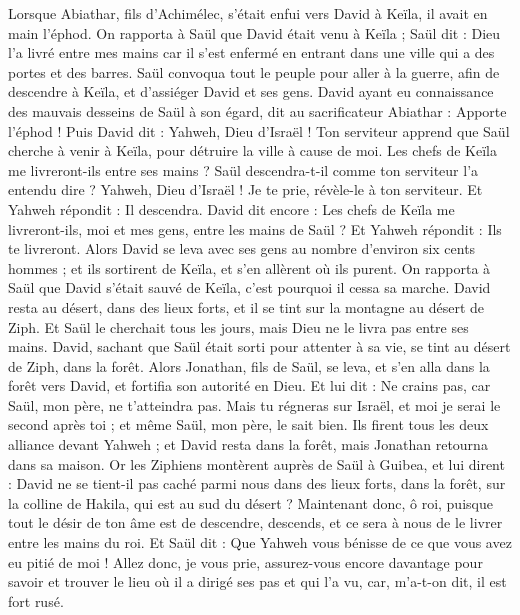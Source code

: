 \begin{multicols}{2}
Lorsque Abiathar, fils d'Achimélec, s'était enfui vers David à Keïla, il avait en main l'éphod.
On rapporta à Saül que David était venu à Keïla ; Saül dit : Dieu l'a livré entre mes mains car il s'est enfermé en entrant dans une ville qui a des portes et des barres.
Saül convoqua tout le peuple pour aller à la guerre, afin de descendre à Keïla, et d'assiéger David et ses gens.
David ayant eu connaissance des mauvais desseins de Saül à son égard, dit au sacrificateur Abiathar : Apporte l'éphod !
Puis David dit : Yahweh, Dieu d'Israël ! Ton serviteur apprend que Saül cherche à venir à Keïla, pour détruire la ville à cause de moi.
Les chefs de Keïla me livreront-ils entre ses mains ? Saül descendra-t-il comme ton serviteur l'a entendu dire ? Yahweh, Dieu d'Israël ! Je te prie, révèle-le à ton serviteur. Et Yahweh répondit : Il descendra.
David dit encore : Les chefs de Keïla me livreront-ils, moi et mes gens, entre les mains de Saül ? Et Yahweh répondit : Ils te livreront.
Alors David se leva avec ses gens au nombre d'environ six cents hommes ; et ils sortirent de Keïla, et s'en allèrent où ils purent. On rapporta à Saül que David s'était sauvé de Keïla, c'est pourquoi il cessa sa marche.
David resta au désert, dans des lieux forts, et il se tint sur la montagne au désert de Ziph. Et Saül le cherchait tous les jours, mais Dieu ne le livra pas entre ses mains.
David, sachant que Saül était sorti pour attenter à sa vie, se tint au désert de Ziph, dans la forêt.
Alors Jonathan, fils de Saül, se leva, et s'en alla dans la forêt vers David, et fortifia son autorité en Dieu.
Et lui dit : Ne crains pas, car Saül, mon père, ne t'atteindra pas. Mais tu régneras sur Israël, et moi je serai le second après toi ; et même Saül, mon père, le sait bien.
Ils firent tous les deux alliance devant Yahweh ; et David resta dans la forêt, mais Jonathan retourna dans sa maison.
Or les Ziphiens montèrent auprès de Saül à Guibea, et lui dirent : David ne se tient-il pas caché parmi nous dans des lieux forts, dans la forêt, sur la colline de Hakila, qui est au sud du désert ?
Maintenant donc, ô roi, puisque tout le désir de ton âme est de descendre, descends, et ce sera à nous de le livrer entre les mains du roi.
Et Saül dit : Que Yahweh vous bénisse de ce que vous avez eu pitié de moi !
Allez donc, je vous prie, assurez-vous encore davantage pour savoir et trouver le lieu où il a dirigé ses pas et qui l'a vu, car, m'a-t-on dit, il est fort rusé.

\end{multicols}
